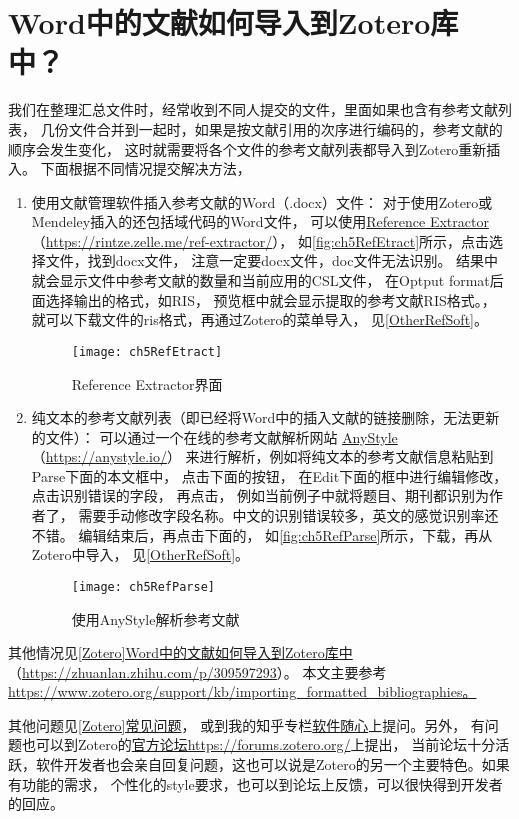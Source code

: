 \documentclass[cn,11pt,chinese]{elegantbook}
\begin{document}
	\section{Word中的文献如何导入到Zotero库中？}\label{sec:RefExtract}	
			我们在整理汇总文件时，经常收到不同人提交的文件，里面如果也含有参考文献列表，
			几份文件合并到一起时，如果是按文献引用的次序进行编码的，参考文献的顺序会发生变化，
			这时就需要将各个文件的参考文献列表都导入到Zotero重新插入。
			下面根据不同情况提交解决方法，
			\begin{enumerate}
				\item 使用文献管理软件插入参考文献的Word（.docx）文件：				
				对于使用Zotero或Mendeley插入的还包括域代码的Word文件，
				可以使用\href{https://rintze.zelle.me/ref-extractor/}
				{Reference Extractor}（\url{https://rintze.zelle.me/ref-extractor/}），
				如\autoref{fig:ch5RefEtract}所示，点击选择文件，找到docx文件，
				注意一定要docx文件，doc文件无法识别。
				结果中就会显示文件中参考文献的数量和当前应用的CSL文件，
				在Optput format后面选择输出的格式，如RIS，
				预览框中就会显示提取的参考文献RIS格式。，
				就可以下载文件的ris格式，再通过Zotero的菜单导入，
				见\cref{OtherRefSoft}。
				\begin{figure}[htbp]
					\centering
					\texttt{[image: ch5RefEtract]}
					\caption{Reference Extractor界面}
					\label{fig:ch5RefEtract}
				\end{figure}
		\item 纯文本的参考文献列表（即已经将Word中的插入文献的链接删除，无法更新的文件）：		
			可以通过一个在线的参考文献解析网站
			\href{https://anystyle.io/}{AnyStyle}（\url{https://anystyle.io/}）
			来进行解析，例如将纯文本的参考文献信息粘贴到Parse下面的本文框中，
			点击下面的按钮，
			在Edit下面的框中进行编辑修改，点击识别错误的字段，
			再点击，
			例如当前例子中就将题目、期刊都识别为作者了，
			需要手动修改字段名称。中文的识别错误较多，英文的感觉识别率还不错。
			编辑结束后，再点击下面的，
			如\autoref{fig:ch5RefParse}所示，下载，再从Zotero中导入，
			见\cref{OtherRefSoft}。
			\begin{figure}[t]
				\centering
				\texttt{[image: ch5RefParse]}
				\caption{使用AnyStyle解析参考文献}
				\label{fig:ch5RefParse}
			\end{figure}
			\end{enumerate}
			
			其他情况见\href{https://zhuanlan.zhihu.com/p/309597293}
			{[Zotero]Word中的文献如何导入到Zotero库中}
			（\url{https://zhuanlan.zhihu.com/p/309597293}）。			
			本文主要参考
			\url{https://www.zotero.org/support/kb/importing_formatted_bibliographies。}


		其他问题见\href{https://zhuanlan.zhihu.com/p/57379260}{[Zotero]常见问题}，
		或到我的知乎专栏\href{https://zhuanlan.zhihu.com/c_1071081428967743488}{软件随心}上提问。另外，
		有问题也可以到Zotero的\href{https://forums.zotero.org/}{官方论坛https://forums.zotero.org/}上提出，
		当前论坛十分活跃，软件开发者也会亲自回复问题，这也可以说是Zotero的另一个主要特色。如果有功能的需求，
		个性化的style要求，也可以到论坛上反馈，可以很快得到开发者的回应。
		
\end{document}

